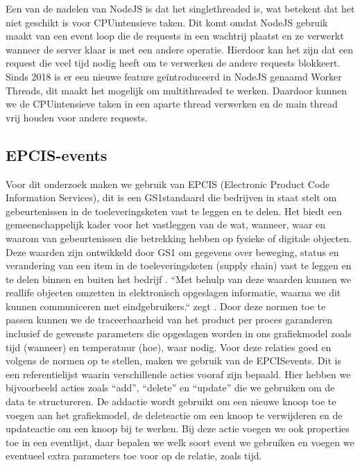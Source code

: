 Een van de nadelen van NodeJS is dat het single\-threaded is, wat betekent dat het niet geschikt is voor CPU\-intensieve taken.
Dit komt omdat NodeJS gebruik maakt van een event loop die de requests in een wachtrij plaatst en ze verwerkt wanneer de server klaar is met een andere operatie.
Hierdoor kan het zijn dat een request die veel tijd nodig heeft om te verwerken de andere requests blokkeert.
Sinds 2018 is er een nieuwe feature geïntroduceerd in NodeJS genaamd Worker Threads, dit maakt het mogelijk om multi\-threaded te werken.
Daardoor kunnen we de CPU\-intensieve taken in een aparte thread verwerken en de main thread vrij houden voor andere requests.

\subsection{EPCIS-events}
Voor dit onderzoek maken we gebruik van EPCIS (Electronic Product Code Information Services), dit is een GS1\-standaard die bedrijven in staat stelt om gebeurtenissen in de toeleveringsketen vast te leggen en te delen. 
Het biedt een gemeenschappelijk kader voor het vastleggen van de wat, wanneer, waar en waarom van gebeurtenissen die betrekking hebben op fysieke of digitale objecten. 
Deze waarden zijn ontwikkeld door GS1 om gegevens over beweging, status en verandering van een item in de toeleveringsketen (supply chain) vast te leggen en te delen binnen en buiten het bedrijf \autocite{Devins}.
``Met behulp van deze waarden kunnen we real\-life objecten omzetten in elektronisch opgeslagen informatie, waarna we dit kunnen communiceren met eindgebruikers.`` zegt \textcite{Devins}.
Door deze normen toe te passen kunnen we de traceerbaarheid van het product per proces garanderen inclusief de gewenste parameters die opgeslagen worden in ons grafiekmodel zoals tijd (wanneer) en temperatuur (hoe), waar nodig.
Voor deze relaties goed en volgens de normen op te stellen, maken we gebruik van de EPCIS\-events. Dit is een referentielijst waarin verschillende acties vooraf zijn bepaald.
Hier hebben we bijvoorbeeld acties zoals ``add'', ``delete'' en ``update'' die we gebruiken om de data te structureren.
De add\-actie wordt gebruikt om een nieuwe knoop toe te voegen aan het grafiekmodel, de delete\-actie om een knoop te verwijderen en de update\-actie om een knoop bij te werken.
Bij deze actie voegen we ook properties toe in een event\-lijst, daar bepalen we welk soort event we gebruiken en voegen we eventueel extra parameters toe voor op de relatie, zoals tijd.


